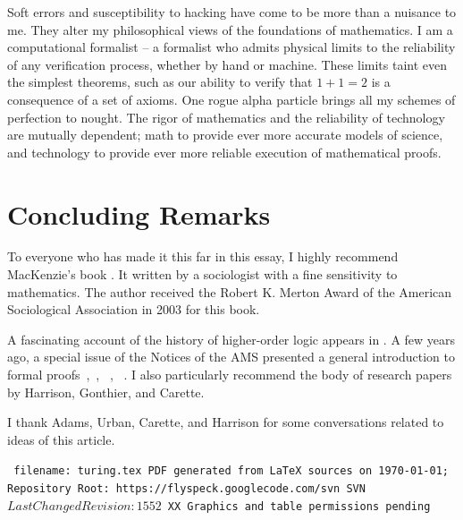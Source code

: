 \documentclass{llncs}
\def\svninfo{{\tt
  filename: turing.tex\hfill\break
  PDF generated from LaTeX sources on \today; \hfill\break
  Repository Root: https://flyspeck.googlecode.com/svn \hfill\break
  SVN $LastChangedRevision: 1552 $
  XX Graphics and table permissions pending
  }
  }
\begin{document}
Soft errors and susceptibility to hacking have come to be more than a
nuisance to me.  They alter my philosophical views of the foundations
of mathematics.  I am a computational formalist -- a formalist who
admits physical limits to the reliability of any verification process,
whether by hand or machine.  These limits taint even the simplest
theorems, such as our ability to verify that $1+1=2$ is a consequence
of a set of axioms.  One rogue alpha particle brings all my schemes of
perfection to nought.  %
The rigor of
mathematics and the reliability of technology are mutually dependent;
math to provide ever more accurate models of science, and technology
to provide ever more reliable execution of mathematical proofs.

\newpage
\section{Concluding Remarks}


To everyone who has made it this far in this essay, I highly recommend
MacKenzie's book \cite{Mac}.  It written by a sociologist with a fine
sensitivity to mathematics.  The author received the Robert K. Merton
Award of the American Sociological Association in 2003 for this book.

A fascinating account of the history of higher-order logic appears in
\cite{Gor}.  A few years ago, a special issue of the Notices of the
AMS presented a general introduction to formal
proofs~\cite{Hales:2008:formal},~\cite{Harrison:2008:formal},
~\cite{gonthier:2008:formal}, ~\cite{Wiedijk:2008:formal}.  I also
particularly recommend the body of research papers by Harrison,
Gonthier, and Carette.



\bigskip

I thank Adams, Urban, Carette, and Harrison 
for some conversations related to ideas of this article.




\raggedright



\bigskip
\noindent
\svninfo
\end{document}
